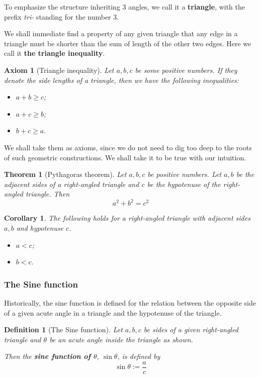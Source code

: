 \documentclass[12pt]{article}
\newtheorem{definition}{Definition}[section]
\newtheorem*{theorem}{Theorem}
\newtheorem*{corollary}{Corollary}
\newtheorem*{axiom}{Axiom}
\begin{document}
    To emphasize the structure inheriting 3 angles, we call it a \textbf{triangle}, with the prefix \textit{tri-} standing for the number 3.

    We shall immediate find a property of any given triangle that any edge in a triangle must be shorter than the sum of length of the other two edges. Here we call it \textbf{the triangle inequality}.

    \begin{axiom}[Triangle inequality]
        Let $a,b,c$ be some positive numbers. If they denote the side lengths of a triangle, then we have the following inequalities:\begin{itemize}
            \item $a+b\geq c$;
            \item $a+c\geq b$;
            \item $b+c\geq a$.
        \end{itemize}
    \end{axiom}

    We shall take them as axioms, since we do not need to dig too deep to the roots of such geometric constructions. We shall take it to be true with our intuition.

    \begin{theorem}[Pythagoras theorem]
        Let $a,b,c$ be positive numbers. Let $a,b$ be the adjacent sides of a right-angled triangle and $c$ be the hypotenuse of the right-angled triangle. Then $$a^2+b^2=c^2$$
    \end{theorem}

    \begin{corollary}
        The following holds for a right-angled triangle with adjacent sides $a,b$ and hypotenuse $c$.
        \begin{itemize}
            \item $a<c$;
            \item $b<c$.
        \end{itemize}
    \end{corollary}

    \subsubsection{The Sine function}

    Historically, the sine function is defined for the relation between the opposite side of a given acute angle in a triangle and the hypotenuse of the triangle.

    \begin{definition}[The Sine function]
        Let $a,b,c$ be sides of a given right-angled triangle and $\theta$ be an acute angle inside the triangle as shown.

        Then the \textbf{sine function of $\theta$}, $\sin{\theta}$, is defined by $$\sin{\theta}:=\frac{a}{c}$$
    \end{definition}
\end{document}
